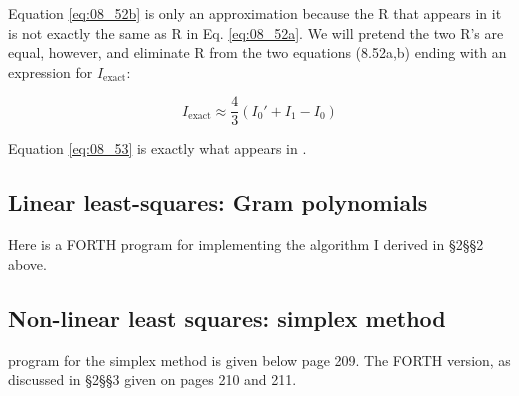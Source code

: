 Equation \ref{eq:08_52b} is only an approximation because the R that appears in it is not exactly the same as R in Eq. \ref{eq:08_52a}. We will pretend the two R’s are equal, however, and eliminate R from the two equations (8.52a,b) ending with an expression for $I_{\text{exact}}$:

\begin{equation}\label{eq:08_53}
    I_{\text{exact}} \approx \frac{4}{3}(I_{0}' + I_{1} - I_{0})
\end{equation}

Equation \ref{eq:08_53} is exactly what appears in .


\subsection{Linear least-squares: Gram polynomials}
Here is a FORTH program for implementing the algorithm
I derived in \S2\S\S2 above.



\subsection{Non-linear least squares: simplex method}
 program for the simplex method is given below page 209. The FORTH version, as discussed in \S2\S\S3 given on pages 210 and 211.



